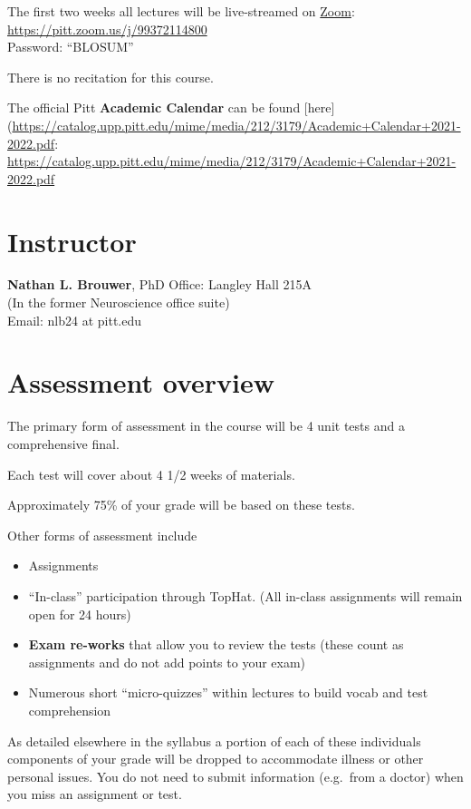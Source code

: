 \documentclass[
]{book}
\providecommand{\tightlist}{%
  \setlength{\itemsep}{0pt}\setlength{\parskip}{0pt}}
\begin{document}
The first two weeks all lectures will be live-streamed on \href{https://pitt.zoom.us/j/99372114800}{Zoom}: \url{https://pitt.zoom.us/j/99372114800}\\
Password: ``BLOSUM''

There is no recitation for this course.

The official Pitt \textbf{Academic Calendar} can be found {[}here{]}(\url{https://catalog.upp.pitt.edu/mime/media/212/3179/Academic+Calendar+2021-2022.pdf}: \url{https://catalog.upp.pitt.edu/mime/media/212/3179/Academic+Calendar+2021-2022.pdf}

\hypertarget{nlb}{%
\chapter{Instructor}\label{nlb}}

\textbf{Nathan L. Brouwer}, PhD
Office: Langley Hall 215A\\
(In the former Neuroscience office suite)\\
Email: nlb24 at pitt.edu

\hypertarget{assessment-overview}{%
\chapter{Assessment overview}\label{assessment-overview}}

The primary form of assessment in the course will be 4 unit tests and a comprehensive final.

Each test will cover about 4 1/2 weeks of materials.

Approximately 75\% of your grade will be based on these tests.

Other forms of assessment include

\begin{itemize}
\tightlist
\item
  Assignments
\item
  ``In-class'' participation through TopHat. (All in-class assignments will remain open for 24 hours)
\item
  \textbf{Exam re-works} that allow you to review the tests (these count as assignments and do not add points to your exam)
\item
  Numerous short ``micro-quizzes'' within lectures to build vocab and test comprehension
\end{itemize}

As detailed elsewhere in the syllabus a portion of each of these individuals components of your grade will be dropped to accommodate illness or other personal issues. You do not need to submit information (e.g.~from a doctor) when you miss an assignment or test.
\end{document}
